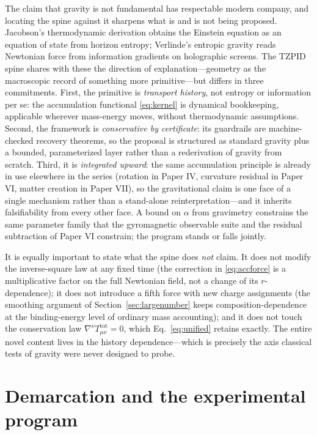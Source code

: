 \documentclass[11pt]{article}
\theoremstyle{remark}
\begin{document}
The claim that gravity is not fundamental has respectable modern company, and locating the spine against it sharpens what is and is not being proposed. Jacobson's thermodynamic derivation obtains the Einstein equation as an equation of state from horizon entropy; Verlinde's entropic gravity reads Newtonian force from information gradients on holographic screens. The TZPID spine shares with these the direction of explanation---geometry as the macroscopic record of something more primitive---but differs in three commitments. First, the primitive is \emph{transport history}, not entropy or information per se: the accumulation functional \eqref{eq:kernel} is dynamical bookkeeping, applicable wherever mass-energy moves, without thermodynamic assumptions. Second, the framework is \emph{conservative by certificate}: its guardrails are machine-checked recovery theorems, so the proposal is structured as standard gravity plus a bounded, parameterized layer rather than a rederivation of gravity from scratch. Third, it is \emph{integrated upward}: the same accumulation principle is already in use elsewhere in the series (rotation in Paper IV, curvature residual in Paper VI, matter creation in Paper VII), so the gravitational claim is one face of a single mechanism rather than a stand-alone reinterpretation---and it inherits falsifiability from every other face. A bound on $\alpha$ from gravimetry constrains the same parameter family that the gyromagnetic observable suite and the residual subtraction of Paper VI constrain; the program stands or falls jointly.

It is equally important to state what the spine does \emph{not} claim. It does not modify the inverse-square law at any fixed time (the correction in \eqref{eq:accforce} is a multiplicative factor on the full Newtonian field, not a change of its $r$-dependence); it does not introduce a fifth force with new charge assignments (the smoothing argument of Section~\ref{sec:largenumber} keeps composition-dependence at the binding-energy level of ordinary mass accounting); and it does not touch the conservation law $\nabla^\nu T^{\mathrm{tot}}_{\mu\nu} = 0$, which Eq.~\eqref{eq:unified} retains exactly. The entire novel content lives in the history dependence---which is precisely the axis classical tests of gravity were never designed to probe.

\section{Demarcation and the experimental program}
\label{sec:demarcation}
\end{document}
